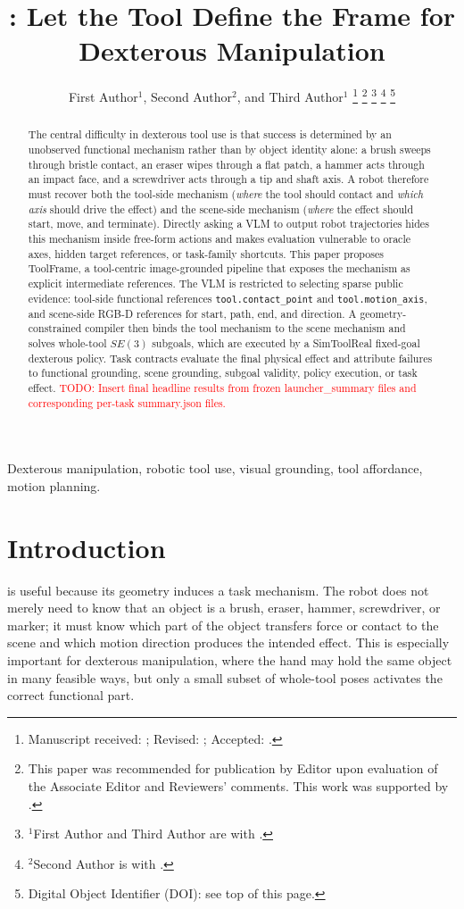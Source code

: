 \documentclass[letterpaper, 10 pt, journal, twoside]{IEEEtran}
\title{\method{}: Let the Tool Define the Frame for Dexterous Manipulation}
\author{First Author$^{1}$, Second Author$^{2}$, and Third Author$^{1}$%
\thanks{Manuscript received: \placeholder{Month Day, Year}; Revised:
\placeholder{Month Day, Year}; Accepted: \placeholder{Month Day, Year}.}%
\thanks{This paper was recommended for publication by Editor
\placeholder{Editor A. Name} upon evaluation of the Associate Editor and
Reviewers' comments. This work was supported by
\placeholder{organizations/grants}.}%
\thanks{$^{1}$First Author and Third Author are with \placeholder{Department,
University, City, Country}. {\tt\footnotesize \placeholder{email}}}%
\thanks{$^{2}$Second Author is with \placeholder{Department, University, City,
Country}. {\tt\footnotesize \placeholder{email}}}%
\thanks{Digital Object Identifier (DOI): see top of this page.}%
}
\newcommand{\todo}[1]{\textcolor{red}{TODO: #1}}
\newcommand{\method}{ToolFrame}
\begin{document}
\maketitle

\begin{abstract}
The central difficulty in dexterous tool use is that success is determined by
an unobserved functional mechanism rather than by object identity alone: a
brush sweeps through bristle contact, an eraser wipes through a flat patch, a
hammer acts through an impact face, and a screwdriver acts through a tip and
shaft axis. A robot therefore must recover both the tool-side mechanism
(\emph{where} the tool should contact and \emph{which axis} should drive the
effect) and the scene-side mechanism (\emph{where} the effect should start,
move, and terminate). Directly asking a VLM to output robot trajectories hides
this mechanism inside free-form actions and makes evaluation vulnerable to
oracle axes, hidden target references, or task-family shortcuts. This paper
proposes \method{}, a tool-centric image-grounded pipeline that exposes the
mechanism as explicit intermediate references. The VLM is restricted to
selecting sparse public evidence: tool-side functional references
\texttt{tool.contact\_point} and \texttt{tool.motion\_axis}, and scene-side
RGB-D references for start, path, end, and direction. A geometry-constrained
compiler then binds the tool mechanism to the scene mechanism and solves
whole-tool $SE(3)$ subgoals, which are executed by a SimToolReal fixed-goal
dexterous policy. Task contracts evaluate the final physical effect and
attribute failures to functional grounding, scene grounding, subgoal validity,
policy execution, or task effect. \todo{Insert final headline results from
frozen launcher\_summary files and corresponding per-task summary.json files.}
\end{abstract}

\begin{IEEEkeywords}
Dexterous manipulation, robotic tool use, visual grounding, tool affordance,
motion planning.
\end{IEEEkeywords}

\section{Introduction}
 is useful because its geometry induces a task
mechanism. The robot does not merely need to know that an object is a brush,
eraser, hammer, screwdriver, or marker; it must know which part of the object
transfers force or contact to the scene and which motion direction produces the
intended effect. This is especially important for dexterous manipulation, where
the hand may hold the same object in many feasible ways, but only a small
subset of whole-tool poses activates the correct functional part.
\end{document}
